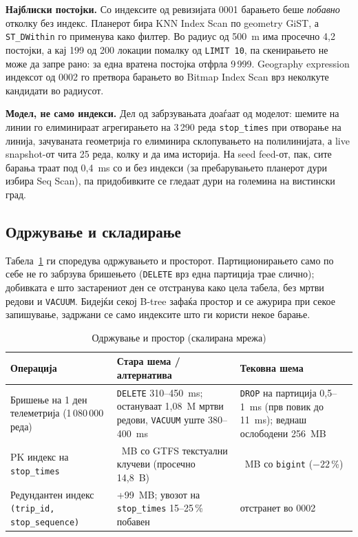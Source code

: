 \documentclass[11pt, a4paper]{article}
\let\oldunderscore\_
\renewcommand{\_}{\oldunderscore\allowbreak}
\newcommand{\code}[1]{\texttt{#1}}
\begin{document}
\textbf{Најблиски постојки.} Со индексите од ревизијата 0001 барањето беше \emph{побавно} отколку без индекс. Планерот бира KNN Index Scan по geometry GiST, а \code{ST\_DWithin} го применува како филтер. Во радиус од 500~m има просечно 4,2 постојки, а кај 199 од 200 локации помалку од \code{LIMIT 10}, па скенирањето не може да запре рано: за една вратена постојка отфрла 9\,999. Geography expression индексот од 0002 го претвора барањето во Bitmap Index Scan врз неколкуте кандидати во радиусот.

\textbf{Модел, не само индекси.} Дел од забрзувањата доаѓаат од моделот: шемите на линии го елиминираат агрегирањето на 3\,290 реда \code{stop\_times} при отворање на линија, зачуваната геометрија го елиминира склопувањето на полилинијата, а live snapshot-от чита 25 реда, колку и да има историја. На seed feed-от, пак, сите барања траат под 0,4~ms со и без индекси (за пребарувањето планерот дури избира Seq Scan), па придобивките се гледаат дури на големина на вистински град.

\subsection{Одржување и складирање}

Табела~\ref{tab:maint} ги споредува одржувањето и просторот. Партиционирањето само по себе не го забрзува бришењето (\code{DELETE} врз една партиција трае слично); добивката е што застарениот ден се отстранува како цела табела, без мртви редови и \code{VACUUM}. Бидејќи секој B-tree зафаќа простор и се ажурира при секое запишување, задржани се само индексите што ги користи некое барање.

\begin{table}[!htb]
\centering
\small
\let\_\oldunderscore
\begin{tabularx}{\textwidth}{@{}>{\raggedright\arraybackslash}X>{\raggedright\arraybackslash}p{5.0cm}>{\raggedright\arraybackslash}p{3.7cm}@{}}
\toprule
\textbf{Операција} & \textbf{Стара шема / алтернатива} & \textbf{Тековна шема} \\
\midrule
Бришење на 1 ден телеметрија (1\,080\,000 реда) & \code{DELETE} 310--450~ms; остануваат 1,08~M мртви редови, \code{VACUUM} уште 380--400~ms & \code{DROP} на партиција 0,5--1~ms (прв повик до 11~ms); веднаш ослободени 256~MB \\
PK индекс на \code{stop\_times} & 128~MB со GTFS текстуални клучеви (просечно 14,8~B) & 100~MB со \code{bigint} ($-22$\,\%) \\
Редундантен индекс \code{(trip\_id, stop\_sequence)} & +99~MB; увозот на \code{stop\_times} 15--25\,\% побавен & отстранет во 0002 \\
\bottomrule
\end{tabularx}
\caption{Одржување и простор (скалирана мрежа)}
\label{tab:maint}
\end{table}
\end{document}
